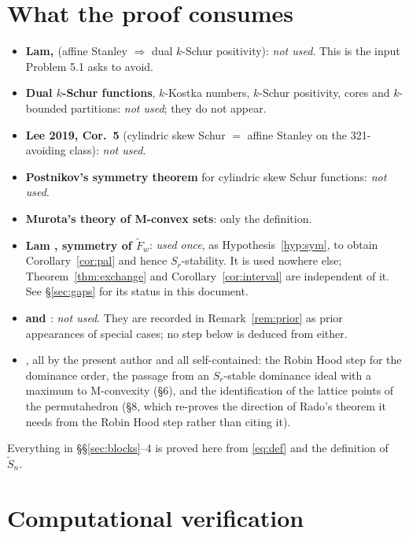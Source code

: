 \documentclass[11pt]{article}
\theoremstyle{definition}
\newcommand{\Saff}{\widetilde{S}_{n}}
\newcommand{\Fw}{\widetilde{F}_{w}}
\begin{document}
\section{What the proof consumes}\label{sec:consumes}

\begin{itemize}
\item \textbf{Lam, \cite[Cor.~8.5]{Lam2008}} (affine Stanley $\Rightarrow$ dual $k$-Schur
positivity): \emph{not used}. This is the input Problem 5.1 asks to avoid.
\item \textbf{Dual $k$-Schur functions}, $k$-Kostka numbers, $k$-Schur positivity, cores and
$k$-bounded partitions: \emph{not used}; they do not appear.
\item \textbf{Lee 2019, Cor.~5} (cylindric skew Schur $=$ affine Stanley on the 321-avoiding
class): \emph{not used}.
\item \textbf{Postnikov's symmetry theorem} for cylindric skew Schur functions: \emph{not
used}.
\item \textbf{Murota's theory of M-convex sets}: only the definition.
\item \textbf{Lam \cite{Lam2006}, symmetry of $\Fw$}: \emph{used once}, as
Hypothesis~\ref{hyp:sym}, to obtain Corollary~\ref{cor:pal} and hence $S_r$-stability. It is
used nowhere else; Theorem~\ref{thm:exchange} and Corollary~\ref{cor:interval} are independent
of it. See \S\ref{sec:gaps} for its status in this document.
\item \textbf{\cite[Lem.~23]{Denton} and \cite[Lem.~3.8]{MorseSchilling}}: \emph{not used}.
They are recorded in Remark~\ref{rem:prior} as prior appearances of special cases; no step
below is deduced from either.
\item \textbf{\cite[Lem.~4.1, \S6 and \S8]{Clio2026}}, all by the present author and all
self-contained: the Robin Hood step for the dominance order, the passage from an $S_r$-stable
dominance ideal with a maximum to M-convexity (\S6), and the identification of the lattice
points of the permutahedron (\S8, which re-proves the direction of Rado's theorem it needs from
the Robin Hood step rather than citing it).
\end{itemize}

Everything in \S\S\ref{sec:blocks}--4 is proved here from \eqref{eq:def} and the definition of
$\Saff$.

\section{Computational verification}\label{sec:verify}
\end{document}
